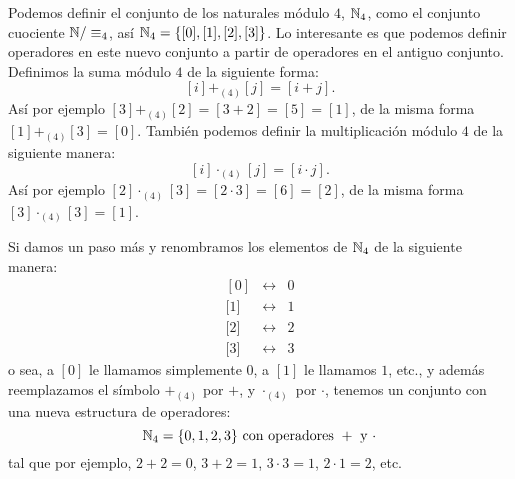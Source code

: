 \begin{ejemplo}
Podemos definir el conjunto de los naturales módulo $4$, $\mathbb{N}_4$, como el conjunto cuociente $\mathbb{N}/\equiv_4$, así $\mathbb{N}_4=\{[0],[1],[2],[3]\}$.
Lo interesante es que podemos definir operadores en este nuevo conjunto a partir de operadores en el antiguo conjunto.
Definimos la suma módulo $4$ de la siguiente forma:
\[
[i]+_{(4)}[j]=[i+j].
\]
Así por ejemplo $[3]+_{(4)}[2]=[3+2]=[5]=[1]$, de la misma forma $[1]+_{(4)}[3]=[0]$.
También podemos definir la multiplicación módulo $4$ de la siguiente manera:
\[
[i]\cdot_{(4)}[j]=[i\cdot j].
\]
Así por ejemplo $[2]\cdot_{(4)}[3]=[2\cdot 3]=[6]=[2]$, de la misma forma $[3]\cdot_{(4)}[3]=[1]$.

Si damos un paso más y renombramos los elementos de $\mathbb{N}_4$ de la siguiente manera:
\[
\begin{array}{ccc}
[0]&\leftrightarrow&0\\
\text{[} 1]&\leftrightarrow&1\\
\text{[}2]&\leftrightarrow&2\\
\text{[}3]&\leftrightarrow&3
\end{array}
\]
o sea, a $[0]$ le llamamos simplemente $0$, a $[1]$ le llamamos $1$, etc., y además reemplazamos el símbolo $+_{(4)}$ por $+$, y $\cdot_{(4)}$ por $\cdot$, tenemos un conjunto con una nueva estructura de operadores:
\[
\mathbb{N}_4=\{0,1,2,3\}\text{ con operadores }+\text{ y }\cdot
\]
tal que por ejemplo, $2+2=0$, $3+2=1$, $3\cdot 3=1$, $2\cdot 1=2$, etc.
\end{ejemplo}

